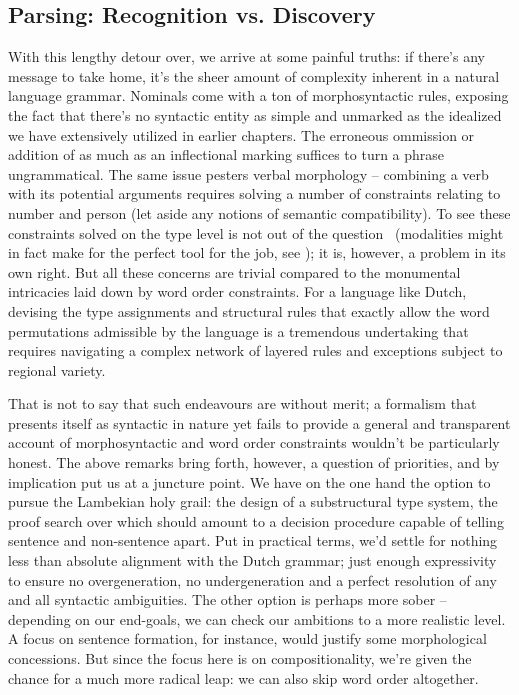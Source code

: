 \subsection{Parsing: Recognition vs. Discovery}
With this lengthy detour over, we arrive at some painful truths: if there's any message to take home, it's the sheer amount of complexity inherent in a natural language grammar.
Nominals come with a ton of morphosyntactic rules, exposing the fact that there's no syntactic entity as simple and unmarked as the idealized \np[s] we have extensively utilized in earlier chapters.
The erroneous ommission or addition of as much as an inflectional marking suffices to turn a phrase ungrammatical.
The same issue pesters verbal morphology -- combining a verb with its potential arguments requires solving a number of constraints relating to number and person (let aside any notions of semantic compatibility).
To see these constraints solved on the type level is not out of the question~\cite{pollard2004type} (modalities might in fact make for the perfect tool for the job, see \citet{moa}); it is, however, a problem in its own right.
But all these concerns are trivial compared to the monumental intricacies laid down by word order constraints.
For a language like Dutch, devising the type assignments and structural rules that exactly allow the word permutations admissible by the language is a tremendous undertaking that requires navigating a complex network of layered rules and exceptions subject to regional variety.

That is not to say that such endeavours are without merit; a formalism that presents itself as syntactic in nature yet fails to provide a general and transparent account of morphosyntactic and word order constraints wouldn't be particularly honest.
The above remarks bring forth, however, a question of priorities, and by implication put us at a juncture point.
We have on the one hand the option to pursue the Lambekian holy grail: the design of a substructural type system, the proof search over which should amount to a decision procedure capable of telling sentence and non-sentence apart.
Put in practical terms, we'd settle for nothing less than absolute alignment with the Dutch grammar; just enough expressivity to ensure no overgeneration, no undergeneration and a perfect resolution of any and all syntactic ambiguities.
The other option is perhaps more sober -- depending on our end-goals, we can check our ambitions to a more realistic level.
A focus on sentence formation, for instance, would justify some morphological concessions.
But since the focus here is on compositionality, we're given the chance for a much more radical leap: we can also skip word order altogether.

